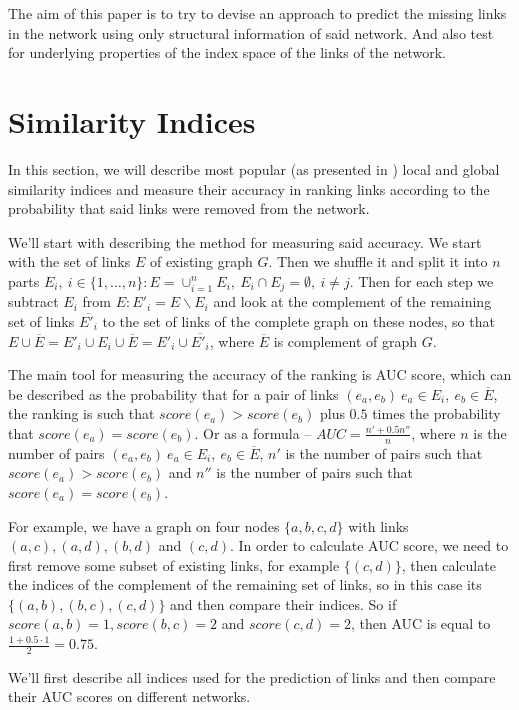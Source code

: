 \documentclass{llncs}
\begin{document}
The aim of this paper is to try to devise an approach to predict the missing links in the network using only structural information of said network. And also test for underlying properties of the index space of the links of the network.
%
\section{Similarity Indices}
%
In this section, we will describe most popular (as presented in \cite{survey}) local and global similarity indices and measure their accuracy in ranking links according to the probability that said links were removed from the network.

We'll start with describing the method for measuring said accuracy. We start with the set of links $E$ of existing graph $G$. Then we shuffle it and split it into $n$ parts $E_i, \ i \in \{1, \ldots, n\} : E = \cup_{i = 1}^{n} E_i, \ E_i \cap E_j = \emptyset, \ i \neq j$. Then for each step we subtract $E_i$ from $E : E'_i = E \backslash E_i$ and look at the complement of the remaining set of links $\overline{E'_i}$ to the set of links of the complete graph on these nodes, so that $E \cup \overline{E} = E'_i \cup E_i \cup \overline{E} = E'_i \cup \overline{E'_i}$, where $\overline{E}$ is complement of graph $G$.

The main tool for measuring the accuracy of the ranking is AUC \cite{auc} score, which can be described as the probability that for a pair of links $(e_a, e_b) \ e_a \in E_i, \ e_b \in \overline{E}$, the ranking is such that $score(e_a) > score(e_b)$ plus $0.5$ times the probability that $score(e_a) = score(e_b)$. Or as a formula -- $AUC = \frac{n' + 0.5 n''}{n}$, where $n$ is the number of pairs $(e_a, e_b) \ e_a \in E_i, \ e_b \in \overline{E}$, $n'$ is the number of pairs such that $score(e_a) > score(e_b)$ and $n''$ is the number of pairs such that $score(e_a) = score(e_b)$.

For example, we have a graph on four nodes $\{a, b, c, d\}$ with links $(a, c), (a, d), (b, d)$ and $(c, d)$. In order to calculate AUC score, we need to first remove some subset of existing links, for example $\{(c, d)\}$, then calculate the indices of the complement of the remaining set of links, so in this case its $\{(a, b), (b, c), (c, d)\}$ and then compare their indices. So if $score(a, b) = 1, score(b, c) = 2$ and $score(c, d) = 2$, then AUC is equal to $\frac{1 + 0.5 \cdot 1}{2} = 0.75$.

We'll first describe all indices used for the prediction of links and then compare their AUC scores on different networks.
%
\end{document}
